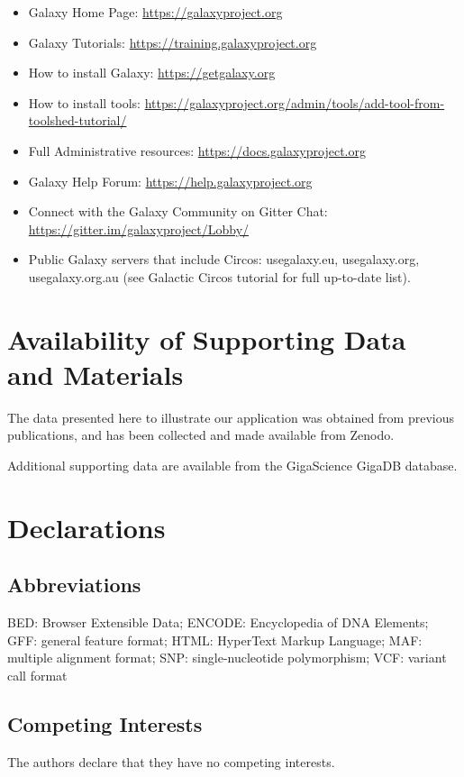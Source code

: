 \begin{itemize}

    \item Galaxy Home Page: \url{https://galaxyproject.org}
    \item Galaxy Tutorials: \url{https://training.galaxyproject.org}
    \item How to install Galaxy: \url{https://getgalaxy.org}
    \item How to install tools: \url{https://galaxyproject.org/admin/tools/add-tool-from-toolshed-tutorial/}
    \item Full Administrative resources: \url{https://docs.galaxyproject.org}
    \item Galaxy Help Forum: \url{https://help.galaxyproject.org}
    \item Connect with the Galaxy Community on Gitter Chat: \url{https://gitter.im/galaxyproject/Lobby/}
    \item Public Galaxy servers that include Circos: usegalaxy.eu, usegalaxy.org, usegalaxy.org.au (see Galactic Circos tutorial for full up-to-date list).
\end{itemize}


\section*{Availability of Supporting Data and Materials}

The data presented here to illustrate our application was obtained from previous publications, and has been collected and made available from Zenodo.

Additional supporting data are available from the GigaScience GigaDB database.

\section*{Declarations}

\subsection*{Abbreviations}

BED: Browser Extensible Data; ENCODE: Encyclopedia of DNA Elements; GFF: general feature format; HTML: HyperText Markup Language; MAF: multiple alignment format; SNP: single-nucleotide polymorphism; VCF: variant call format

\subsection*{Competing Interests}
The authors declare that they have no competing interests.

